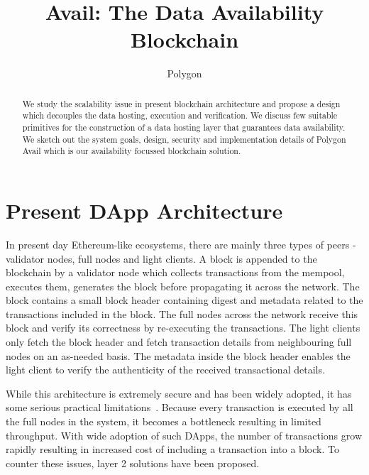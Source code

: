 \documentclass[sigconf, screen=true, nonacm]{acmart}
\begin{document}
\title{Avail: The Data Availability Blockchain}
\author{Polygon \vspace{1cm}}

\begin{abstract}
    We study the scalability issue in present blockchain architecture and propose a design which decouples the data hosting, execution and verification. We discuss few suitable primitives for the construction of a data hosting layer that guarantees data availability. We sketch out the system goals, design, security and implementation details of Polygon Avail which is our availability focussed blockchain solution. 
\end{abstract}

\maketitle


\section{Present DApp Architecture}
    In present day Ethereum-like ecosystems, there are mainly three types of peers - validator nodes, full nodes and light clients. A block is appended to the blockchain by a validator node which collects transactions from the mempool, executes them, generates the block before propagating it across the network. The block contains a small block header containing digest and metadata related to the transactions included in the block. The full nodes across the network receive this block and verify its correctness by re-executing the transactions. The light clients only fetch the block header and fetch transaction details from neighbouring full nodes on an as-needed basis. The metadata inside the block header enables the light client to verify the authenticity of the received transactional details. 

    While this architecture is extremely secure and has been widely adopted, it has some serious practical limitations~\cite{Stanford:2020}. Because every transaction is executed by all the full nodes in the system, it becomes a bottleneck resulting in limited throughput. With wide adoption of such DApps, the number of transactions grow rapidly resulting in increased cost of including a transaction into a block. To counter these issues, layer 2 solutions have been proposed. 
\end{document}
